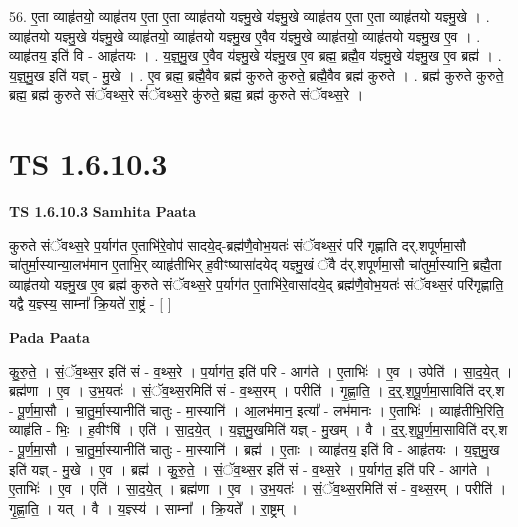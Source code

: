 \documentclass[17pt]{extarticle}
\begin{document}
56. ए॒ता व्याहृ॑तयो॒ व्याहृ॑तय ए॒ता ए॒ता व्याहृ॑तयो यज्ञ्मु॒खे य॑ज्ञ्मु॒खे व्याहृ॑तय ए॒ता ए॒ता व्याहृ॑तयो यज्ञ्मु॒खे । . व्याहृ॑तयो यज्ञ्मु॒खे य॑ज्ञ्मु॒खे व्याहृ॑तयो॒ व्याहृ॑तयो यज्ञ्मु॒ख ए॒वैव य॑ज्ञ्मु॒खे व्याहृ॑तयो॒ व्याहृ॑तयो यज्ञ्मु॒ख ए॒व । . व्याहृ॑तय॒ इति॑ वि - आहृ॑तयः । . य॒ज्ञ्॒मु॒ख ए॒वैव य॑ज्ञ्मु॒खे य॑ज्ञ्मु॒ख ए॒व ब्रह्म॒ ब्रह्मै॒व य॑ज्ञ्मु॒खे य॑ज्ञ्मु॒ख ए॒व ब्रह्म॑ । . य॒ज्ञ्॒मु॒ख इति॑ यज्ञ् - मु॒खे । . ए॒व ब्रह्म॒ ब्रह्मै॒वैव ब्रह्म॑ कुरुते कुरुते॒ ब्रह्मै॒वैव ब्रह्म॑ कुरुते । . ब्रह्म॑ कुरुते कुरुते॒ ब्रह्म॒ ब्रह्म॑ कुरुते संॅवथ्स॒रे सं॑ॅवथ्स॒रे कु॑रुते॒ ब्रह्म॒ ब्रह्म॑ कुरुते संॅवथ्स॒रे । \newline
\pagebreak
{}
\section*{ TS 1.6.10.3 }

\textbf{TS 1.6.10.3 } \newline
\textbf{Samhita Paata} \newline

कुरुते संॅवथ्स॒रे प॒र्याग॑त ए॒ताभि॑रे॒वोप॑ सादये॒द्-ब्रह्म॑णै॒वोभ॒यतः॑ संॅवथ्स॒रं परि॑ गृह्णाति दर्.शपूर्णमा॒सौ चा॑तुर्मा॒स्यान्या॒लभ॑मान ए॒ताभि॒र् व्याहृ॑तीभिर् ह॒वीꣳष्यासा॑दयेद् यज्ञ्मु॒खं ॅवै द॑र्.शपूर्णमा॒सौ चा॑तुर्मा॒स्यानि॒ ब्रह्मै॒ता व्याहृ॑तयो यज्ञ्मु॒ख ए॒व ब्रह्म॑ कुरुते संॅवथ्स॒रे प॒र्याग॑त ए॒ताभि॑रे॒वासा॑दये॒द् ब्रह्म॑णै॒वोभ॒यतः॑ संॅवथ्स॒रं परि॑गृह्णाति॒ यद्वै य॒ज्ञ्स्य॒ साम्ना᳚ क्रि॒यते॑ रा॒ष्ट्रं - [ ] \newline

\textbf{Pada Paata} \newline

कु॒रु॒ते॒ । सं॒ॅव॒थ्स॒र इति॑ सं - व॒थ्स॒रे । प॒र्याग॑त॒ इति॑ परि - आग॑ते । ए॒ताभिः॑ । ए॒व । उपेति॑ । सा॒द॒ये॒त् । ब्रह्म॑णा । ए॒व । उ॒भ॒यतः॑ । सं॒ॅव॒थ्स॒रमिति॑ सं - व॒थ्स॒रम् । परीति॑ । गृ॒ह्णा॒ति॒ । द॒र्॒.श॒पू॒र्ण॒मा॒साविति॑ दर्.श - पू॒र्ण॒मा॒सौ । चा॒तु॒र्मा॒स्यानीति॑ चातुः - मा॒स्यानि॑ । आ॒लभ॑मान॒ इत्या᳚ - लभ॑मानः । ए॒ताभिः॑ । व्याहृ॑तीभि॒रिति॒ व्याहृ॑ति - भिः॒ । ह॒वीꣳषि॑ । एति॑ । सा॒द॒ये॒त् । य॒ज्ञ्॒मु॒खमिति॑ यज्ञ् - मु॒खम् । वै । द॒र्॒.श॒पू॒र्ण॒मा॒साविति॑ दर्.श - पू॒र्ण॒मा॒सौ । चा॒तु॒र्मा॒स्यानीति॑ चातुः - मा॒स्यानि॑ । ब्रह्म॑ । ए॒ताः । व्याहृ॑तय॒ इति॑ वि - आहृ॑तयः । य॒ज्ञ्॒मु॒ख इति॑ यज्ञ् - मु॒खे । ए॒व । ब्रह्म॑ । कु॒रु॒ते॒ । सं॒ॅव॒थ्स॒र इति॑ सं - व॒थ्स॒रे । प॒र्याग॑त॒ इति॑ परि - आग॑ते । ए॒ताभिः॑ । ए॒व । एति॑ । सा॒द॒ये॒त् । ब्रह्म॑णा । ए॒व । उ॒भ॒यतः॑ । सं॒ॅव॒थ्स॒रमिति॑ सं - व॒थ्स॒रम् । परीति॑ । गृ॒ह्णा॒ति॒ । यत् । वै । य॒ज्ञ्स्य॑ । साम्ना᳚ । क्रि॒यते᳚ । रा॒ष्ट्रम् ।  \newline
\end{document}
